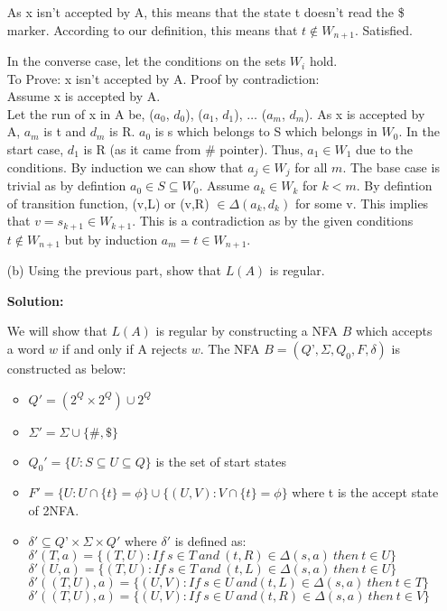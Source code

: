 \documentclass[11pt]{article}
\begin{document}
\begin{enumerate}
		As x isn't accepted by A, this means that the state t doesn't read the \$ marker. According to our definition, this means that $t \notin W_{n+1}$. Satisfied.
		
		In the converse case, let the conditions on the sets $W_i$ hold.\\
		To Prove: x isn't accepted by A.
		\clearpage
		Proof by contradiction:\\
		Assume x is accepted by A.\\
		Let the run of x in A be, ($a_0$, $d_0$), ($a_1$, $d_1$), $\dots$ ($a_m$, $d_m$). As x is accepted by A, $a_m$ is t and $d_m$ is R.
		$a_0$ is s which belongs to S which belongs in $W_0$. In the start case, $d_1$ is R (as it came from \# pointer). Thus, $a_1 \in W_1$ due to the conditions. By induction we can show that $a_j \in W_j$ for all $m$. The base case is trivial as by defintion $a_0 \in S \subseteq W_0$. Assume $a_k \in W_k$ for $k < m$. By defintion of transition function, (v,L) or (v,R) $\in \Delta(a_k,d_k)$ for some v. This implies that $v = s_{k+1} \in W_{k+1}$. This is a contradiction as by the given conditions $t \notin W_{n+1}$ but by induction $a_m = t \in W_{n+1}$.
		
		\item[(b)] Using the previous part, show that $L(A)$ is regular.
		
		\textbf{Solution:}
		
		We will show that $L(A)$ is regular by constructing a NFA $B$ which accepts a word $w$ if and only if A rejects $w$. The NFA $B = (Q’,\Sigma,Q_0 ,F,\delta) $ is constructed as below:
		\begin{itemize}
		    \item $Q' = (2^Q \times 2^Q) \cup 2^Q$
		    \item $\Sigma' = \Sigma \cup \{\#, \$\}$
		    \item $Q_0' = \{ U : S \subseteq U \subseteq Q \}$ is the set of start states
		    \item $ F'  = \{ U : U \cap \{ t \} = \phi \} \cup \{ (U,V) : V \cap \{t \} = \phi \} $ where t is the accept state of 2NFA.
		    \item $\delta' \subseteq Q’ \times \Sigma \times Q'$ where $\delta'$ is defined as:\\
            $\delta'(T, a) = \{ (T, U ) : If\ s \in T\ and\ (t,R) \in \Delta(s,a)\ then\ t \in U \}$\\
            $\delta'(U, a) = \{(T, U ) : If\ s \in T\ and\ (t,L) \in \Delta(s,a)\ then\ t \in U \}$\\
            $\delta'((T, U ), a) = \{(U, V ) : If\ s \in U\ and (t,L) \in \Delta(s,a)\ then\ t \in T\}$\\
            $\delta'((T, U ), a) = \{(U, V ) : If\ s \in U\ and (t,R) \in \Delta(s,a)\ then\ t \in V \}$


\end{itemize}
\end{enumerate}
\end{document}
